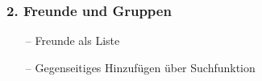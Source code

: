 \documentclass[aspectratio=1610]{beamer}
\begin{document}

	\begin{frame}[plain]
	\frametitle{2. Freunde und Gruppen}
	\begin{minipage}{0.5\textwidth}
	\setlength{\fboxsep}{0pt}%
	\setlength{\fboxrule}{1pt}%
	\captionsetup{labelformat=empty}
	\centering
	\end{minipage}%
	\begin{minipage}{0.5\textwidth}
		\begin{itemize}
			\setlength\itemsep{0.3em}
			\item[--] Freunde als Liste
			\item[--]	Gegenseitiges Hinzufügen über Suchfunktion
		\end{itemize}
	\end{minipage}%
	\end{frame}
\end{document}
